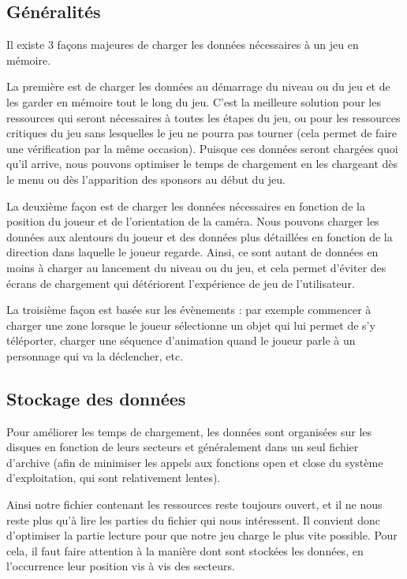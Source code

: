 \documentclass[a4paper, 11pt]{article} %
\begin{document}
\subsection*{Généralités}
Il existe 3 façons majeures de charger les données nécessaires à un jeu en mémoire.

La première est de charger les données au démarrage du niveau ou du jeu et de les garder en mémoire tout le long du jeu. C'est la meilleure solution pour les ressources qui seront nécessaires à toutes les étapes du jeu, ou pour les ressources critiques du jeu sans lesquelles le jeu ne pourra pas tourner (cela permet de faire une vérification par la même occasion). Puisque ces données seront chargées quoi qu'il arrive, nous pouvons optimiser le temps de chargement en les chargeant dès le menu ou dès l'apparition des sponsors au début du jeu.

La deuxième façon est de charger les données nécessaires en fonction de la position du joueur et de l'orientation de la caméra. Nous pouvons charger les données aux alentours du joueur et des données plus détaillées en fonction de la direction dans laquelle le joueur regarde. Ainsi, ce sont autant de données en moins à charger au lancement du niveau ou du jeu, et cela permet d'éviter des écrans de chargement qui détériorent l’expérience de jeu de l'utilisateur.

La troisième façon est basée sur les évènements : par exemple commencer à charger une zone lorsque le joueur sélectionne un objet qui lui permet de s'y téléporter, charger une séquence d'animation quand le joueur parle à un personnage qui va la déclencher, etc.

\newpage
\subsection*{Stockage des données}
Pour améliorer les temps de chargement, les données sont organisées sur les disques en fonction de leurs secteurs et généralement dans un seul fichier d'archive (afin de minimiser les appels aux fonctions open et close du système d'exploitation, qui sont relativement lentes).


Ainsi notre fichier contenant les ressources reste toujours ouvert, et il ne nous reste plus qu'à lire les parties du fichier qui nous intéressent. Il convient donc d'optimiser la partie lecture pour que notre jeu charge le plus vite possible. Pour cela, il faut faire attention à la manière dont sont stockées les données, en l’occurrence leur position vis à vis des secteurs.
\end{document}
